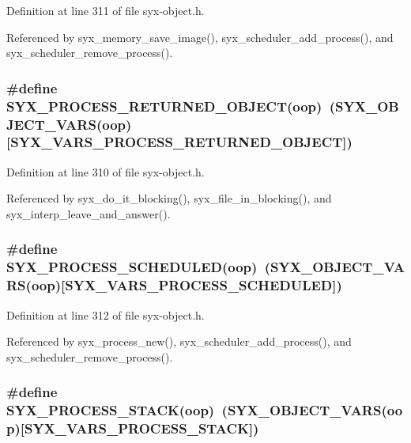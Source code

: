 Definition at line 311 of file syx-object.h.

Referenced by syx\_\-memory\_\-save\_\-image(), syx\_\-scheduler\_\-add\_\-process(), and syx\_\-scheduler\_\-remove\_\-process().\hypertarget{syx-object_8h_c6e63002ff510661d3f5c92177d9018e}{
\subsubsection{\setlength{\rightskip}{0pt plus 5cm}\#define SYX\_\-PROCESS\_\-RETURNED\_\-OBJECT(oop)~(SYX\_\-OBJECT\_\-VARS(oop)\mbox{[}SYX\_\-VARS\_\-PROCESS\_\-RETURNED\_\-OBJECT\mbox{]})}}
\label{syx-object_8h_c6e63002ff510661d3f5c92177d9018e}




Definition at line 310 of file syx-object.h.

Referenced by syx\_\-do\_\-it\_\-blocking(), syx\_\-file\_\-in\_\-blocking(), and syx\_\-interp\_\-leave\_\-and\_\-answer().\hypertarget{syx-object_8h_99cbfe2ae15b516f6d3a60c06a8a3915}{
\subsubsection{\setlength{\rightskip}{0pt plus 5cm}\#define SYX\_\-PROCESS\_\-SCHEDULED(oop)~(SYX\_\-OBJECT\_\-VARS(oop)\mbox{[}SYX\_\-VARS\_\-PROCESS\_\-SCHEDULED\mbox{]})}}
\label{syx-object_8h_99cbfe2ae15b516f6d3a60c06a8a3915}




Definition at line 312 of file syx-object.h.

Referenced by syx\_\-process\_\-new(), syx\_\-scheduler\_\-add\_\-process(), and syx\_\-scheduler\_\-remove\_\-process().\hypertarget{syx-object_8h_7c831375f6160c5b537d391cab06e10e}{
\subsubsection{\setlength{\rightskip}{0pt plus 5cm}\#define SYX\_\-PROCESS\_\-STACK(oop)~(SYX\_\-OBJECT\_\-VARS(oop)\mbox{[}SYX\_\-VARS\_\-PROCESS\_\-STACK\mbox{]})}}
\label{syx-object_8h_7c831375f6160c5b537d391cab06e10e}




